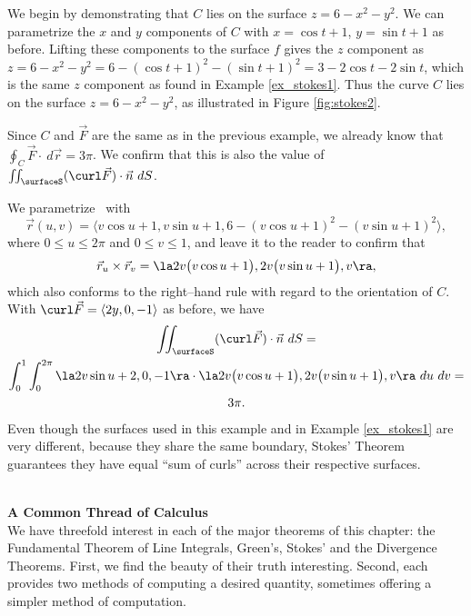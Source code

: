 {We begin by demonstrating that $C$ lies on the surface $z=6-x^2-y^2$. We can parametrize the $x$ and $y$ components of $C$ with $x=\cos t+1$, $y=\sin t+1$ as before. Lifting these components to the surface $f$ gives the $z$ component as $z = 6-x^2-y^2 = 6-(\cos t+1)^2-(\sin t+1)^2 = 3-2\cos t-2\sin t$, which is the same $z$ component as found in Example \ref{ex_stokes1}. Thus the curve $C$ lies on the surface $z=6-x^2-y^2$, as illustrated in Figure \ref{fig:stokes2}. 


Since $C$ and $\vec F$ are the same as in the previous example, we already know that $\oint_C\vec F\cdot\ d\vec r = 3\pi$. We confirm that this is also the value of $\iint_\surfaceS (\curl\vec F)\cdot \vec n\ dS $.

We parametrize \surfaceS\ with 
\[
\vec r(u,v) = \langle v\cos u+1,v\sin u+1, 6-(v\cos u+1)^2-(v\sin u+1)^2\rangle,
\]
where $0\leq u\leq 2\pi$ and $0\leq v\leq 1$, and leave it to the reader to confirm that
\[
\vec r_u\times \vec r_v = \la 2v\big(v\cos u+1\big), 2v\big(v\sin u+1\big),v\ra,
\]
which also conforms to the right--hand rule with regard to the orientation of $C$. With $\curl \vec F = \langle 2y,0,-1\rangle$ as before, we have
\begin{multline*}
\iint_\surfaceS (\curl\vec F)\cdot \vec n\ dS = \\ 
\int_0^1\int_0^{2\pi} \la 2v\sin u+2,0,-1\ra\cdot \la 2v\big(v\cos u+1\big), 2v\big(v\sin u+1\big),v\ra\ du\ dv =\\
3\pi.
\end{multline*}
Even though the  surfaces used in this example and in Example \ref{ex_stokes1} are very different, because they share the same boundary, Stokes' Theorem guarantees they have equal ``sum of curls'' across their respective surfaces.
}\\

\clearpage
\noindent\textbf{\large A Common Thread of Calculus}\\

We have threefold interest in each of the major theorems of this chapter: the Fundamental Theorem of Line Integrals, Green's, Stokes' and the Divergence Theorems. First, we find the beauty of their truth interesting. Second, each provides two methods of computing a desired quantity, sometimes offering a simpler method of computation. 

